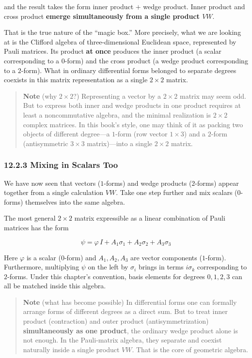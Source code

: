 \documentclass[a4paper,12pt,openany]{book}
\begin{document}
and the result takes the form inner product \(+\) wedge product. Inner
product and cross product \textbf{emerge simultaneously from a single
product \(VW\)}.

That is the true nature of the ``magic box.'' More precisely, what we
are looking at is the Clifford algebra of three-dimensional Euclidean
space, represented by Pauli matrices. Its product \textbf{at once}
produces the inner product (a scalar corresponding to a \(0\)-form) and
the cross product (a wedge product corresponding to a \(2\)-form). What
in ordinary differential forms belonged to separate degrees coexists in
this matrix representation as a single \(2\times2\) matrix.

\begin{quote}
\textbf{Note} (why \(2\times2\)?) Representing a vector by a
\(2\times2\) matrix may seem odd. But to express both inner and wedge
products in one product requires at least a noncommutative algebra, and
the minimal realization is \(2\times2\) complex matrices. In this book's
style, one may think of it as packing two objects of different
degree—a \(1\)-form (row vector \(1\times3\)) and a \(2\)-form
(antisymmetric \(3\times3\) matrix)—into a single \(2\times2\) matrix.
\end{quote}

\hypertarget{mixing-in-scalars-too}{%
\subsubsection{12.2.3 Mixing in Scalars
Too}\label{mixing-in-scalars-too}}

We have now seen that vectors (\(1\)-forms) and wedge products
(\(2\)-forms) appear together from a single calculation \(VW\). Take one
step further and mix scalars (\(0\)-forms) themselves into the same
algebra.

The most general \(2\times2\) matrix expressible as a linear combination
of Pauli matrices has the form

\[\psi = \varphi\,I + A_1\sigma_1 + A_2\sigma_2 + A_3\sigma_3\]

Here \(\varphi\) is a scalar (\(0\)-form) and \(A_1,A_2,A_3\) are vector
components (\(1\)-form). Furthermore, multiplying \(\psi\) on the left
by \(\sigma_i\) brings in terms \(i\sigma_k\) corresponding to
\(2\)-forms. Under this chapter's convention, basis elements for degrees
\(0,1,2,3\) can all be matched inside this algebra.

\begin{quote}
\textbf{Note} (what has become possible) In differential forms one can
formally arrange forms of different degrees as a direct sum. But to
treat inner product (contraction) and outer product (antisymmetrization)
\textbf{simultaneously as one product}, the ordinary wedge product alone
is not enough. In the Pauli-matrix algebra, they separate and coexist
naturally inside a single product \(VW\). That is the core of geometric
algebra.
\end{quote}
\end{document}
